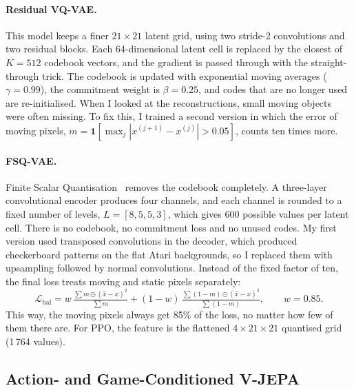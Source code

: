 \documentclass[runningheads]{llncs}
\begin{document}
\paragraph{Residual VQ-VAE.} This model keeps a finer $21\times21$ latent grid, using two
stride-2 convolutions and two residual blocks. Each 64-dimensional latent cell is replaced by
the closest of $K=512$ codebook vectors, and the gradient is passed through with the
straight-through trick. The codebook is updated with exponential moving averages
($\gamma=0.99$), the commitment weight is $\beta=0.25$, and codes that are no longer used are
re-initialised. When I looked at the reconstructions, small moving objects were often missing.
To fix this, I trained a second version in which the error of moving pixels,
$m=\mathbf{1}[\max_j|x^{(j+1)}-x^{(j)}|>0.05]$, counts ten times more.

\paragraph{FSQ-VAE.} Finite Scalar Quantisation~\cite{mentzer2024fsq} removes the codebook
completely. A three-layer convolutional encoder produces four channels, and each channel is
rounded to a fixed number of levels, $L=[8,5,5,3]$, which gives 600 possible values per latent
cell. There is no codebook, no commitment loss and no unused codes. My first version used
transposed convolutions in the decoder, which produced checkerboard patterns on the flat Atari
backgrounds, so I replaced them with upsampling followed by normal convolutions. Instead of the
fixed factor of ten, the final loss treats moving and static pixels separately:
\begin{equation}
  \mathcal{L}_{\text{bal}} = w\,\tfrac{\sum m\odot(\hat x-x)^2}{\sum m}
  +(1-w)\,\tfrac{\sum (1-m)\odot(\hat x-x)^2}{\sum (1-m)},\qquad w=0.85.
\end{equation}
This way, the moving pixels always get 85\% of the loss, no matter how few of them there are.
For PPO, the feature is the flattened $4\times21\times21$ quantised grid (1\,764 values).

\subsection{Action- and Game-Conditioned V-JEPA}
\end{document}
